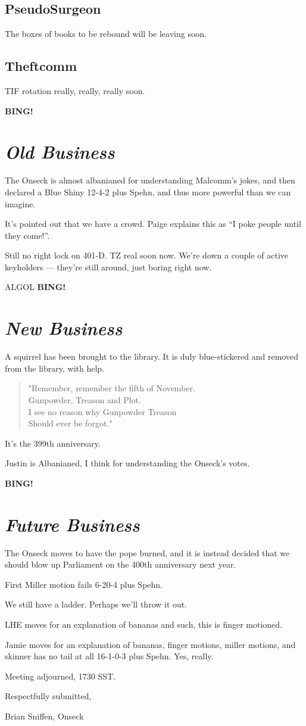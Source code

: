 \documentclass[10pt]{article}
\newcommand{\bing}{{\bf BING!} }
\newcommand{\goto}[1]{\bing \vskip 12pt \section*{{\em{#1}}}}
\newcommand{\ps}{ plus Spehn\xspace}
\begin{document}
\subsection*{PseudoSurgeon}
The boxes of books to be rebound will be leaving soon.

\subsection*{Theftcomm}
TIF rotation really, really, really soon.

\goto{Old Business}
The Onseck is almost albanianed for understanding Malcomm's jokes,
and then declared a Blue Shiny 12-4-2\ps, and thus more powerful than
we can imagine.

It's pointed out that we have a crowd.
Paige explains this as ``I poke people until they come!''.


Still no right lock on 401-D.  TZ real soon now.  We're down a couple
of active keyholders --- they're still around, just boring right now.

ALGOL
\goto{New Business}

A squirrel has been brought to the library.  It is duly blue-stickered
and removed from the library, with help.

\begin{quotation}
"Remember,  remember the fifth of November.\\
Gunpowder,  Treason and Plot.\\
I see no reason  why Gunpowder Treason\\
Should ever be  forgot."
\end{quotation}

It's the 399th anniversary.

Justin is Albanianed, I think for understanding the Onseck's votes.

\goto{Future Business}


The Onseck moves to have the pope burned, and it is instead decided
that we should blow up Parliament on the 400th anniversary next year.

First Miller motion fails 6-20-4\ps.

We still have a ladder.  Perhaps we'll throw it out.

LHE moves for an explanation of bananas and such, this is finger
motioned.

Jamie moves for an explanation of bananas, finger motions, miller
motions, and skinner has no tail at all 16-1-0-3\ps.  Yes, really.

\vspace{12pt}

\noindent
Meeting adjourned, 1730 SST.

\vspace{18pt}

\centerline{Respectfully submitted,}
\centerline{Brian Sniffen, Onseck}
\end{document}
